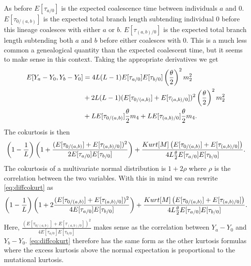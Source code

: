 As before $E[\tau_{a/0}]$ is the expected coalescence time between individuals
$a$ and $0$. $E[\tau_{0/(a,b)}]$ is the expected total branch length subtending
individual $0$ before this lineage coalesces with either $a$ or $b$.
$E[\tau_{(a,b)/0}]$ is the expected total branch length subtending both $a$ and
$b$ before either coalesces with $0$. This is a much less common a genealogical
quantity than the expected coalescent time, but it seems to make sense in this
context. Taking the appropriate derivatives we get
\begin{align}
\label{eq:diffcokurt}
  E[Y_a-Y_0,Y_b-Y_0] &= 4L(L-1)E[\tau_{a/0}]E[\tau_{b/0}]\left(\frac{\theta}{2}\right)^2m_2^2 \nonumber \\
                     &+ 2L(L-1)(E[\tau_{0/(a,b)}]+E[\tau_{(a,b)/0}])^2\left( \frac{\theta}{2} \right)^2 m_2^2 \nonumber \\
                     &+ L E[\tau_{0/(a,b)}] \frac{\theta}{2} m_4 + L E[\tau_{(a,b)/0}] \frac{\theta}{2} m_4.
\end{align}
The cokurtosis is then 
\begin{equation}
  \left( 1 - \frac{1}{L} \right) \left( 1 + 
  \frac{(E[\tau_{0/(a,b)}]+E[\tau_{(a,b)/0}])^2}{2E[\tau_{a/0}]E[\tau_{b/0}]} \right)+ 
  \frac{Kurt[M]\left(E[\tau_{0/(a,b)}] +  E[\tau_{(a,b)/0}]\right)}{4L \frac{\theta}{2} E[\tau_{a/0}]E[\tau_{b/0}]}.
\end{equation}
The cokurtosis of a multivariate normal distribution is $1+2\rho$ where $\rho$
is the correlation between the two variables. With this in mind we can
rewrite \eqref{eq:diffcokurt} as
\begin{equation}
  \left( 1 - \frac{1}{L} \right) \left( 1 + 
  2\frac{(E[\tau_{0/(a,b)}]+E[\tau_{(a,b)/0}])^2}{4E[\tau_{a/0}]E[\tau_{b/0}]} \right)+ 
  \frac{Kurt[M]\left(E[\tau_{0/(a,b)}] +  E[\tau_{(a,b)/0}]\right)}{4L \frac{\theta}{2} E[\tau_{a/0}]E[\tau_{b/0}]}.
\end{equation}
Here,
$\frac{(E[\tau_{0/(a,b)}]+E[\tau_{(a,b)/0}])^2}{4E[\tau_{a/0}]E[\tau_{b/0}]}$
makes sense as the correlation between $Y_a-Y_0$ and
$Y_b-Y_0$. \eqref{eq:diffcokurt} therefore has the same form as the other
kurtosis formulas where the excess kurtosis above the normal expectation is
proportional to the mutational kurtosis.
